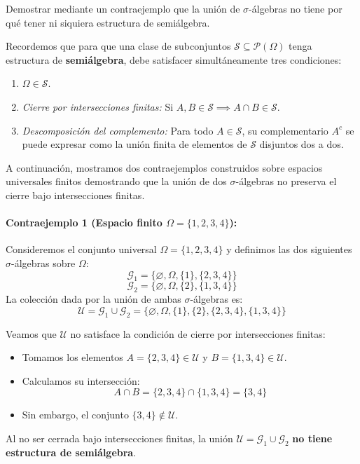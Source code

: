 \newpage
\begin{problema}
Demostrar mediante un contraejemplo que la unión de $\sigma$-álgebras no tiene por qué tener ni siquiera estructura de semiálgebra.

\tcblower

Recordemos que para que una clase de subconjuntos $\mathcal{S} \subseteq \mathcal{P}(\Omega)$ tenga estructura de \textbf{semiálgebra}, debe satisfacer simultáneamente tres condiciones:
\begin{enumerate}
    \item $\Omega \in \mathcal{S}$.
    \item \textit{Cierre por intersecciones finitas:} Si $A, B \in \mathcal{S} \implies A \cap B \in \mathcal{S}$.
    \item \textit{Descomposición del complemento:} Para todo $A \in \mathcal{S}$, su complementario $A^c$ se puede expresar como la unión finita de elementos de $\mathcal{S}$ disjuntos dos a dos.
\end{enumerate}

A continuación, mostramos dos contraejemplos construidos sobre espacios universales finitos demostrando que la unión de dos $\sigma$-álgebras no preserva el cierre bajo intersecciones finitas.

\paragraph{Contraejemplo 1 (Espacio finito $\Omega = \{1, 2, 3, 4\}$):}
Consideremos el conjunto universal $\Omega = \{1, 2, 3, 4\}$ y definimos las dos siguientes $\sigma$-álgebras sobre $\Omega$:
\[
    \mathcal{G}_1 = \{ \varnothing, \Omega, \{1\}, \{2,3,4\} \}
\]
\[
    \mathcal{G}_2 = \{ \varnothing, \Omega, \{2\}, \{1,3,4\} \}
\]
La colección dada por la unión de ambas $\sigma$-álgebras es:
\[
    \mathcal{U} = \mathcal{G}_1 \cup \mathcal{G}_2 = \{ \varnothing, \Omega, \{1\}, \{2\}, \{2,3,4\}, \{1,3,4\} \}
\]

Veamos que $\mathcal{U}$ no satisface la condición de cierre por intersecciones finitas:
\begin{itemize}
    \item Tomamos los elementos $A = \{2,3,4\} \in \mathcal{U}$ y $B = \{1,3,4\} \in \mathcal{U}$.
    \item Calculamos su intersección:
    \[
        A \cap B = \{2,3,4\} \cap \{1,3,4\} = \{3,4\}
    \]
    \item Sin embargo, el conjunto $\{3,4\} \notin \mathcal{U}$.
\end{itemize}
Al no ser cerrada bajo intersecciones finitas, la unión $\mathcal{U} = \mathcal{G}_1 \cup \mathcal{G}_2$ \textbf{no tiene estructura de semiálgebra}.


\end{problema}
